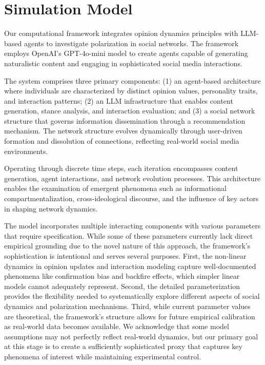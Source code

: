 \section{Simulation Model}
Our computational framework integrates opinion dynamics principles with LLM-based agents to investigate polarization in social networks. The framework employs OpenAI's GPT-4o-mini model to create agents capable of generating naturalistic content and engaging in sophisticated social media interactions.



The system comprises three primary components: (1) an agent-based architecture where individuals are characterized by distinct opinion values, personality traits, and interaction patterns; (2) an LLM infrastructure that enables content generation, stance analysis, and interaction evaluation; and (3) a social network structure that governs information dissemination through a recommendation mechanism. The network structure evolves dynamically through user-driven formation and dissolution of connections, reflecting real-world social media environments.

Operating through discrete time steps, each iteration encompasses content generation, agent interactions, and network evolution processes. This architecture enables the examination of emergent phenomena such as informational compartmentalization, cross-ideological discourse, and the influence of key actors in shaping network dynamics.

The model incorporates multiple interacting components with various parameters that require specification. While some of these parameters currently lack direct empirical grounding due to the novel nature of this approach, the framework's sophistication is intentional and serves several purposes. First, the non-linear dynamics in opinion updates and interaction modeling capture well-documented phenomena like confirmation bias and backfire effects, which simpler linear models cannot adequately represent. Second, the detailed parameterization provides the flexibility needed to systematically explore different aspects of social dynamics and polarization mechanisms. Third, while current parameter values are theoretical, the framework's structure allows for future empirical calibration as real-world data becomes available. We acknowledge that some model assumptions may not perfectly reflect real-world dynamics, but our primary goal at this stage is to create a sufficiently sophisticated proxy that captures key phenomena of interest while maintaining experimental control.

